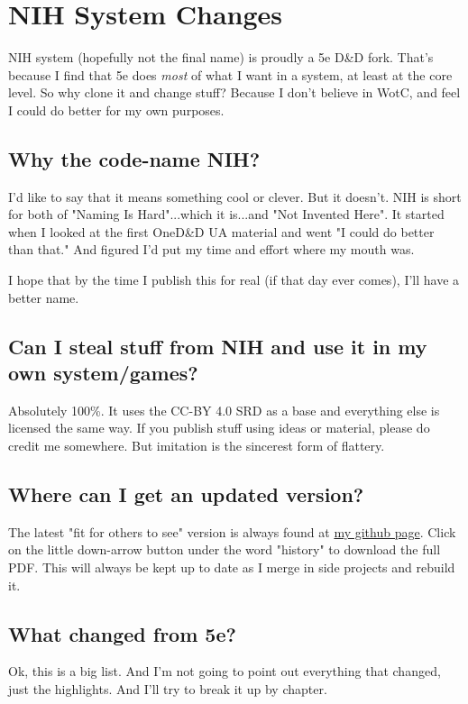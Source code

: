 \chapter*{NIH System Changes}
NIH system (hopefully not the final name) is proudly a 5e D\&D fork. That's because I find that 5e does \textit{most} of what I want in a system, at least at the core level. So why clone it and change stuff? Because I don't believe in WotC, and feel I could do better for my own purposes.

\section{Why the code-name NIH?}
I'd like to say that it means something cool or clever. But it doesn't. NIH is short for both of "Naming Is Hard"...which it is...and "Not Invented Here". It started when I looked at the first OneD\&D UA material and went "I could do better than that." And figured I'd put my time and effort where my mouth was.

I hope that by the time I publish this for real (if that day ever comes), I'll have a better name.

\section{Can I steal stuff from NIH and use it in my own system/games?}
Absolutely 100\%. It uses the CC-BY 4.0 SRD as a base and everything else is licensed the same way. If you publish stuff using ideas or material, please do credit me somewhere. But imitation is the sincerest form of flattery.

\section{Where can I get an updated version?}
The latest "fit for others to see" version is always found at \href{https://github.com/bentomhall/nih-system/blob/main/main.pdf}{my github page}. Click on the little down-arrow button under the word "history" to download the full PDF. This will always be kept up to date as I merge in side projects and rebuild it.

\section{What changed from 5e?}
Ok, this is a big list. And I'm not going to point out everything that changed, just the highlights. And I'll try to break it up by chapter.

